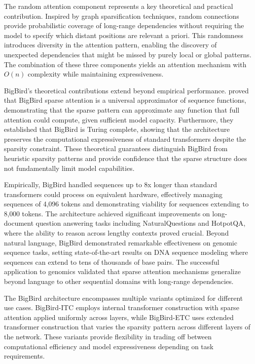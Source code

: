 The random attention component represents a key theoretical and practical contribution. Inspired by graph sparsification techniques, random connections provide probabilistic coverage of long-range dependencies without requiring the model to specify which distant positions are relevant a priori. This randomness introduces diversity in the attention pattern, enabling the discovery of unexpected dependencies that might be missed by purely local or global patterns. The combination of these three components yields an attention mechanism with $O(n)$ complexity while maintaining expressiveness.

BigBird's theoretical contributions extend beyond empirical performance. \citet{zaheer2020bigbird} proved that BigBird sparse attention is a universal approximator of sequence functions, demonstrating that the sparse pattern can approximate any function that full attention could compute, given sufficient model capacity. Furthermore, they established that BigBird is Turing complete, showing that the architecture preserves the computational expressiveness of standard transformers despite the sparsity constraint. These theoretical guarantees distinguish BigBird from heuristic sparsity patterns and provide confidence that the sparse structure does not fundamentally limit model capabilities.

Empirically, BigBird handled sequences up to 8x longer than standard transformers could process on equivalent hardware, effectively managing sequences of 4,096 tokens and demonstrating viability for sequences extending to 8,000 tokens. The architecture achieved significant improvements on long-document question answering tasks including NaturalQuestions and HotpotQA, where the ability to reason across lengthy contexts proved crucial. Beyond natural language, BigBird demonstrated remarkable effectiveness on genomic sequence tasks, setting state-of-the-art results on DNA sequence modeling where sequences can extend to tens of thousands of base pairs. The successful application to genomics validated that sparse attention mechanisms generalize beyond language to other sequential domains with long-range dependencies.

The BigBird architecture encompasses multiple variants optimized for different use cases. BigBird-ITC employs internal transformer construction with sparse attention applied uniformly across layers, while BigBird-ETC uses extended transformer construction that varies the sparsity pattern across different layers of the network. These variants provide flexibility in trading off between computational efficiency and model expressiveness depending on task requirements.

